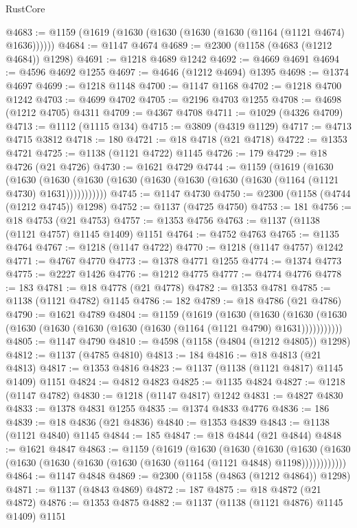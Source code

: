 \begin{lexlean}{RustCore}
\begin{coremodule}
@4683 := @1159 (@1619 (@1630 (@1630 (@1630 (@1630 (@1164 (@1121 @4674) @1636))))))
@4684 := @1147 @4674
@4689 := @2300 (@1158 (@4683 (@1212 @4684)) @1298)
@4691 := @1218 @4689 @1242
@4692 := @4669 @4691
@4694 := @4596 @4692 @1255
@4697 := @4646 (@1212 @4694) @1395
@4698 := @1374 @4697
@4699 := @1218 @1148
@4700 := @1147 @1168
@4702 := @1218 @4700 @1242
@4703 := @4699 @4702
@4705 := @2196 @4703 @1255
@4708 := @4698 (@1212 @4705) @4311
@4709 := @4367 @4708
@4711 := @1029 (@4326 @4709)
@4713 := @1112 (@1115 @134)
@4715 := @3809 (@4319 @1129)
@4717 := @4713 @4715 @3812
@4718 := 180
@4721 := @18 @4718 (@21 @4718)
@4722 := @1353 @4721
@4725 := @1138 (@1121 @4722) @1145
@4726 := 179
@4729 := @18 @4726 (@21 @4726)
@4730 := @1621 @4729
@4744 := @1159
    (@1619
      (@1630
        (@1630
          (@1630 (@1630 (@1630 (@1630 (@1630 (@1630 (@1630 (@1164 (@1121 @4730) @1631)))))))))))
@4745 := @1147 @4730
@4750 := @2300 (@1158 (@4744 (@1212 @4745)) @1298)
@4752 := @1137 (@4725 @4750)
@4753 := 181
@4756 := @18 @4753 (@21 @4753)
@4757 := @1353 @4756
@4763 := @1137 (@1138 (@1121 @4757) @1145 @1409) @1151
@4764 := @4752 @4763
@4765 := @1135 @4764
@4767 := @1218 (@1147 @4722)
@4770 := @1218 (@1147 @4757) @1242
@4771 := @4767 @4770
@4773 := @1378 @4771 @1255
@4774 := @1374 @4773
@4775 := @2227 @1426
@4776 := @1212 @4775
@4777 := @4774 @4776
@4778 := 183
@4781 := @18 @4778 (@21 @4778)
@4782 := @1353 @4781
@4785 := @1138 (@1121 @4782) @1145
@4786 := 182
@4789 := @18 @4786 (@21 @4786)
@4790 := @1621 @4789
@4804 := @1159
    (@1619
      (@1630
        (@1630
          (@1630 (@1630 (@1630 (@1630 (@1630 (@1630 (@1630 (@1164 (@1121 @4790) @1631)))))))))))
@4805 := @1147 @4790
@4810 := @4598 (@1158 (@4804 (@1212 @4805)) @1298)
@4812 := @1137 (@4785 @4810)
@4813 := 184
@4816 := @18 @4813 (@21 @4813)
@4817 := @1353 @4816
@4823 := @1137 (@1138 (@1121 @4817) @1145 @1409) @1151
@4824 := @4812 @4823
@4825 := @1135 @4824
@4827 := @1218 (@1147 @4782)
@4830 := @1218 (@1147 @4817) @1242
@4831 := @4827 @4830
@4833 := @1378 @4831 @1255
@4835 := @1374 @4833 @4776
@4836 := 186
@4839 := @18 @4836 (@21 @4836)
@4840 := @1353 @4839
@4843 := @1138 (@1121 @4840) @1145
@4844 := 185
@4847 := @18 @4844 (@21 @4844)
@4848 := @1621 @4847
@4863 := @1159
    (@1619
      (@1630
        (@1630
          (@1630
            (@1630 (@1630 (@1630 (@1630 (@1630 (@1630 (@1630 (@1164 (@1121 @4848) @1198))))))))))))
@4864 := @1147 @4848
@4869 := @2300 (@1158 (@4863 (@1212 @4864)) @1298)
@4871 := @1137 (@4843 @4869)
@4872 := 187
@4875 := @18 @4872 (@21 @4872)
@4876 := @1353 @4875
@4882 := @1137 (@1138 (@1121 @4876) @1145 @1409) @1151

\end{coremodule}
\end{lexlean}
